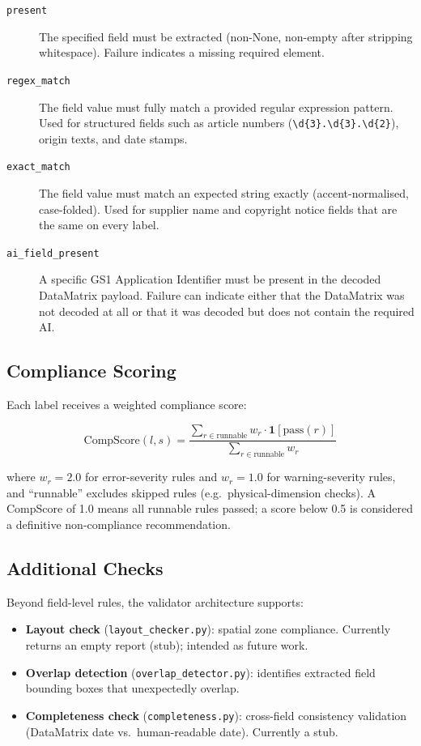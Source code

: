 \begin{description}
  \item[\texttt{present}] The specified field must be extracted (non-None, non-empty
  after stripping whitespace). Failure indicates a missing required element.

  \item[\texttt{regex\_match}] The field value must fully match a provided regular
  expression pattern. Used for structured fields such as article numbers (\texttt{\textbackslash d\{3\}.\textbackslash d\{3\}.\textbackslash d\{2\}}), origin texts, and date stamps.

  \item[\texttt{exact\_match}] The field value must match an expected string exactly
  (accent-normalised, case-folded). Used for supplier name and copyright notice fields
  that are the same on every label.

  \item[\texttt{ai\_field\_present}] A specific GS1 Application Identifier must be present
  in the decoded DataMatrix payload. Failure can indicate either that the DataMatrix was not
  decoded at all or that it was decoded but does not contain the required AI.
\end{description}

\subsection{Compliance Scoring}

Each label receives a weighted compliance score:

\begin{equation}
\text{CompScore}(l, s) = \frac{\displaystyle\sum_{r \in \text{runnable}} w_r \cdot \mathbf{1}[\text{pass}(r)]}
           {\displaystyle\sum_{r \in \text{runnable}} w_r}
\label{eq:compliance_score}
\end{equation}

where $w_r = 2.0$ for error-severity rules and $w_r = 1.0$ for warning-severity rules,
and ``runnable'' excludes skipped rules (e.g.\ physical-dimension checks). A
CompScore of 1.0 means all runnable rules passed; a score below 0.5 is considered a
definitive non-compliance recommendation.

\subsection{Additional Checks}

Beyond field-level rules, the validator architecture supports:
\begin{itemize}
  \item \textbf{Layout check} (\texttt{layout\_checker.py}): spatial zone compliance.
  Currently returns an empty report (stub); intended as future work.
  \item \textbf{Overlap detection} (\texttt{overlap\_detector.py}): identifies extracted
  field bounding boxes that unexpectedly overlap.
  \item \textbf{Completeness check} (\texttt{completeness.py}): cross-field consistency
  validation (DataMatrix date vs.\ human-readable date). Currently a stub.
\end{itemize}

